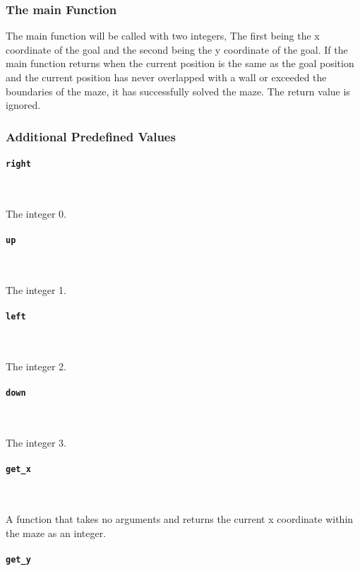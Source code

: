 \subsubsection{The main Function}

The main function will be called with two integers, The first being the x coordinate of the goal and the second being the y coordinate of the goal. If the main function returns when the current position is the same as the goal position and the current position has never overlapped with a wall or exceeded the boundaries of the maze, it has successfully solved the maze. The return value is ignored.

\subsubsection{Additional Predefined Values}

\paragraph{\texttt{right}} \

The integer 0.

\paragraph{\texttt{up}} \

The integer 1.

\paragraph{\texttt{left}} \

The integer 2.

\paragraph{\texttt{down}} \

The integer 3.

\paragraph{\texttt{get\_x}} \

A function that takes no arguments and returns the current x coordinate within the maze as an integer.

\paragraph{\texttt{get\_y}} \

